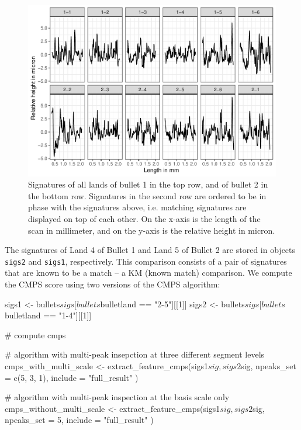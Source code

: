 \begin{Schunk}
\begin{figure}

{\centering \includegraphics[width=\textwidth]{ju-hofmann_files/figure-latex/sigs-1} 

}

\caption[Signatures of all lands of bullet 1 in the top row, and of bullet 2 in the bottom row]{Signatures of all lands of bullet 1 in the top row, and of bullet 2 in the bottom row. Signatures in the second row are ordered to be in phase with the signatures above, i.e. matching signatures are displayed on top of each other. On the x-axis is the length of the scan in millimeter, and on the y-axis is the relative height in micron.}\label{fig:sigs}
\end{figure}
\end{Schunk}

The signatures of Land 4 of Bullet 1 and Land 5 of Bullet 2 are stored
in objects \texttt{sigs2} and \texttt{sigs1}, respectively. This
comparison consists of a pair of signatures that are known to be a match
-- a KM (known match) comparison. We compute the CMPS score using two
versions of the CMPS algorithm:

\begin{Schunk}
\begin{Sinput}
sigs1 <- bullets$sigs[bullets$bulletland == "2-5"][[1]]
sigs2 <- bullets$sigs[bullets$bulletland == "1-4"][[1]]

# compute cmps

# algorithm with multi-peak insepction at three different segment levels
cmps_with_multi_scale <-
  extract_feature_cmps(sigs1$sig, sigs2$sig,
    npeaks_set = c(5, 3, 1), include = "full_result"
  )

# algorithm with multi-peak inspection at the basis scale only
cmps_without_multi_scale <-
  extract_feature_cmps(sigs1$sig, sigs2$sig,
    npeaks_set = 5, include = "full_result"
  )
\end{Sinput}
\end{Schunk}

